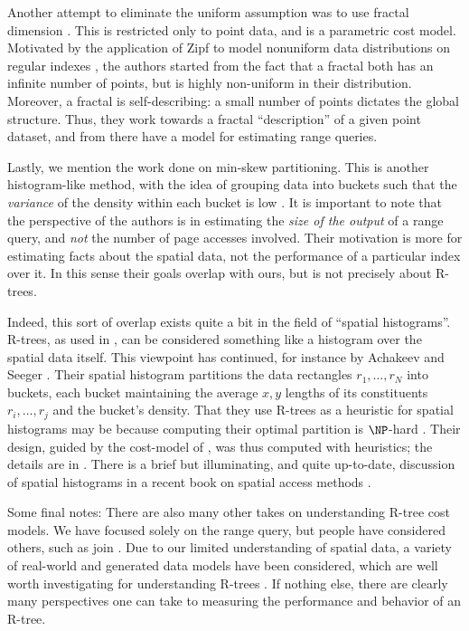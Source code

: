 Another attempt to eliminate the uniform assumption was to use fractal dimension \cite{faloutsoskamel94}. This is restricted only to point data, and is a parametric cost model.
Motivated by the application of Zipf to model nonuniform data distributions on regular indexes \cite{ioannidischristodoulakis91}, the authors started from the fact that a fractal both has an infinite number of points, but is highly non-uniform in their distribution.
Moreover, a fractal is self-describing: a small number of points dictates the global structure.
Thus, they work towards a fractal ``description'' of a given point dataset, and from there have a model for estimating range queries.

Lastly, we mention the work done on min-skew partitioning.
This is another histogram-like method, with the idea of grouping data into buckets such that the \emph{variance} of the density within each bucket is low \cite{acharyapoosalaramaswamy99}.
It is important to note that the perspective of the authors is in estimating the \emph{size of the output} of a range query, and \emph{not} the number of page accesses involved.
Their motivation is more for estimating facts about the spatial data, not the performance of a particular index over it.
In this sense their goals overlap with ours, but is not precisely about R-trees.

Indeed, this sort of overlap exists quite a bit in the field of ``spatial histograms''.
R-trees, as used in \cite{acharyapoosalaramaswamy99}, can be considered something like a histogram over the spatial data itself.
This viewpoint has continued, for instance by Achakeev and Seeger \cite{achakeevseeger12}.
Their spatial histogram partitions the data rectangles $r_1,\ldots,r_N$ into buckets, each bucket maintaining the average $x,y$ lengths of its constituents $r_i,\ldots,r_j$ and the bucket's density.
That they use R-trees as a heuristic for spatial histograms may be because computing their optimal partition is $\NP$-hard \cite{muthukrishnanpoosalasuel99}.
Their design, guided by the cost-model of \cite{theodoridissellis96}, was thus computed with heuristics; the details are in \cite{achakeevseeger12a}.
There is a brief but illuminating, and quite up-to-date, discussion of spatial histograms in a recent book on spatial access methods \cite{mamoulis11}.

Some final notes:
There are also many other takes on understanding R-tree cost models.
We have focused solely on the range query, but people have considered others, such as join \cite{thebook,aboulnaganaughton00}.
Due to our limited understanding of spatial data, a variety of real-world and generated data models have been considered, which are well worth investigating for understanding R-trees \cite{aboulnaganaughton00, anyangsivasubramaniam01, achakeevseeger12,achakeevseeger12a}.
If nothing else, there are clearly many perspectives one can take to measuring the performance and behavior of an R-tree.

